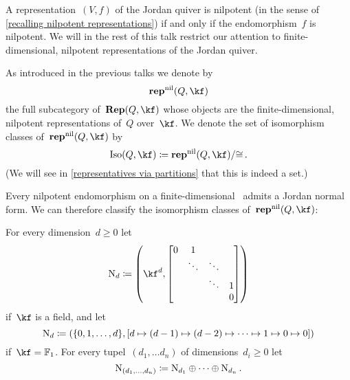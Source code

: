 \documentclass[a4paper,11pt]{scrartcl}
\begin{document}
A representation~$(V, f)$ of the Jordan quiver is nilpotent (in the sense of \cref{recalling nilpotent representations}) if and only if the endomorphism~$f$ is nilpotent.
We will in the rest of this talk restrict our attention to finite-dimensional, nilpotent representations of the Jordan quiver.

As introduced in the previous talks we denote by
\[
  \repnil(Q, \kf)
\]
the full subcategory of~$\Rep(Q, \kf)$ whose objects are the finite-dimensional, nilpotent representations of~$Q$ over~$\kf$.
We denote the set of isomorphism classes of~$\repnil(Q, \kf)$ by
\[
  \Iso(Q, \kf)
  \defined
  \repnil(Q, \kf) / {\cong} \,.
\]
(We will see in \cref{representatives via partitions} that this is indeed a set.)

Every nilpotent endomorphism on a finite-dimensional~\vectorspace{$\kf$} admits a Jordan normal form.
We can therefore classify the isomorphism classes of~$\repnil(Q, \kf)$:

\begin{definition}
  For every dimension~$d \geq 0$ let
  \[
    \Nil_d
    \defined
    \left(
      \kf^d,
      \begin{bmatrix}
        0 & 1       &         &   \\
          & \ddots  & \ddots  &   \\
          &         & \ddots  & 1 \\
          &         &         & 0
      \end{bmatrix}
    \right)
  \]
  if~$\kf$ is a field, and let
  \[
    \mathrm{N}_d
    \coloneqq
    (
      \{ 0, 1, \dotsc, d \},
      [d \mapsto (d-1) \mapsto (d-2) \mapsto \dotsb \mapsto 1 \mapsto 0 \mapsto 0]
    )
  \]
  if~$\kf = \Finite_1$.
  For every tupel~$(d_1, \dotsc d_n)$ of dimensions~$d_i \geq 0$ let
  \[
    \mathrm{N}_{(d_1, \dotsc, d_n)}
    \coloneqq
    \mathrm{N}_{d_1} \oplus \dotsb \oplus \mathrm{N}_{d_n} \,.
  \]
\end{definition}
\end{document}
